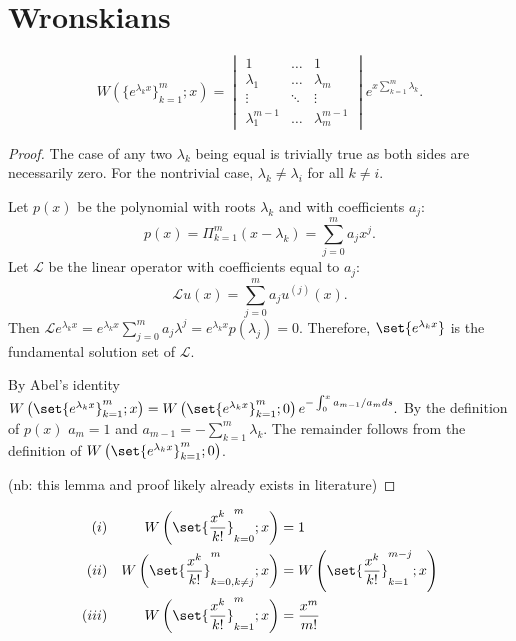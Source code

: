 \documentclass{book}
\begin{document}
\section{Wronskians}
\begin{lemma}
\begin{equation*}
W(\{e^{\lambda_k x} \}_{k=1}^m; x) = \begin{vmatrix} 1 & \dots & 1 \\
\lambda_1 & \dots & \lambda_m \\
\vdots & \ddots & \vdots \\
\lambda_1^{m-1} & \dots & \lambda_m^{m-1} \end{vmatrix}
e^{x \sum_{k=1}^m \lambda_k} .
\end{equation*}
\label{lem:exp}
\end{lemma}

\begin{proof}
The case of any two $\lambda_k$ being equal is trivially true as both sides are necessarily zero.
For the nontrivial case, $\lambda_k \neq \lambda_i$ for all $k \neq i$.

Let $p(x)$ be the polynomial with roots $\lambda_k$ and with coefficients $a_j$:
\begin{equation*}
p(x) = \Pi_{k=1}^m \left (x - \lambda_k \right) = \sum_{j=0}^m a_j x^j.
\end{equation*}
Let $\mathcal{L}$ be the linear operator with coefficients equal to $a_j$:
$$
\mathcal{L} u(x) = \sum_{j=0}^m a_j u^{(j)}(x).
$$
Then $\mathcal{L} e^{\lambda_k x} = e^{\lambda_k x} \sum_{j=0}^m a_j \lambda^j = e^{\lambda_k x} p(\lambda_j) = 0$.
Therefore, $\set{e^{\lambda_k x}}$ is the fundamental solution set of $\mathcal{L}$.

By Abel's identity $\W{\set{e^{\lambda_k x}}_{k=1}^m}{x} = \W{\set{e^{\lambda_k x}}_{k=1}^m}{0} e^{-\int_0^x a_{m-1} / a_m ds}.$
By the definition of $p(x)$ $a_m = 1$ and $a_{m-1} = -\sum_{k=1}^m \lambda_k$.
The remainder follows from the definition of $\W{\set{e^{\lambda_k x}}_{k=1}^m}{0}$.

(nb: this lemma and proof likely already exists in literature)
\end{proof}

\newcommand{\Wpoly}[2]{\W{\set{\Poly{k}}_{#1}^{#2}}{x}}

\begin{lemma}
\begin{align*}
(i) && \Wpoly{k=0}{m} & = 1 \\
(ii) && \Wpoly{k=0,k \neq j}{m} & = \Wpoly{k=1}{m-j} \\
(iii) && \Wpoly{k=1}{m} & = \Poly{m}
\end{align*}
\label{lem:poly}
\end{lemma}
\end{document}
